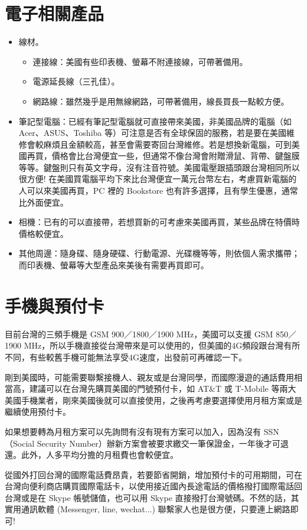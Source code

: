 \documentclass[10pt,a4paper]{book}
\begin{document}
\begin{CJK}{UTF8}{bkai}
\section{電子相關產品}
\begin{itemize}
\item 線材。
\begin{itemize}
\item 連接線：美國有些印表機、螢幕不附連接線，可帶著備用。
\item 電源延長線（三孔佳）。
\item 網路線：雖然幾乎是用無線網路，可帶著備用，線長買長一點較方便。
\end{itemize}
\item 筆記型電腦：已經有筆記型電腦就可直接帶來美國，非美國品牌的電腦（如 Acer、ASUS、Toshiba 等）可注意是否有全球保固的服務，若是要在美國維修會較麻煩且金額較高，甚至會需要寄回台灣維修。若是想換新電腦，可到美國再買，價格會比台灣便宜一些，但通常不像台灣會附贈滑鼠、背帶、鍵盤膜等等。鍵盤則只有英文字母，沒有注音符號。美國電壓跟插頭跟台灣相同所以很方便!
在美國買電腦平均下來比台灣便宜一萬元台幣左右，考慮買新電腦的人可以來美國再買，PC 裡的 Bookstore 也有許多選擇，且有學生優惠，通常比外面便宜。
\item 相機：已有的可以直接帶，若想買新的可考慮來美國再買，某些品牌在特價時價格較便宜。
\item 其他周邊：隨身碟、隨身硬碟、行動電源、光碟機等等，則依個人需求攜帶；而印表機、螢幕等大型產品來美後有需要再買即可。
\end{itemize}
 
\section{手機與預付卡}
目前台灣的三頻手機是 GSM 900／1800／1900 MHz，美國可以支援 GSM 850／1900 MHz，所以手機直接從台灣帶來是可以使用的，但美國的4G頻段跟台灣有所不同，有些較舊手機可能無法享受4G速度，出發前可再確認一下。

剛到美國時，可能需要聯繫接機人、親友或是台灣同學，而國際漫遊的通話費用相當高，建議可以在台灣先購買美國的門號預付卡，如 AT\&T 或 T-Mobile 等兩大美國手機業者，剛來美國後就可以直接使用，之後再考慮要選擇使用月租方案或是繼續使用預付卡。

如果想要轉為月租方案可以先詢問有沒有現有方案可以加入，因為沒有 SSN（Social Security Number）辦新方案會被要求繳交一筆保證金，一年後才可退還。此外，人多平均分擔的月租費也會較便宜。

從國外打回台灣的國際電話費昂貴，若要節省開銷，增加預付卡的可用期間，可在台灣向便利商店購買國際電話卡，以使用接近國內長途電話的價格撥打國際電話回台灣或是在 Skype 帳號儲值，也可以用 Skype 直接撥打台灣號碼。不然的話，其實用通訊軟體 (Messenger, line, wechat...) 聯繫家人也是很方便，只要連上網路即可!


\end{CJK}
\end{document}
